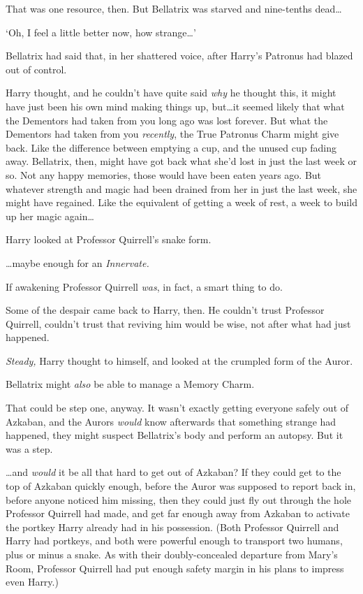 That was one resource, then. But Bellatrix was starved and nine-tenths dead…

‘Oh, I feel a little better now, how strange…’

Bellatrix had said that, in her shattered voice, after Harry’s Patronus had blazed out of control.

Harry thought, and he couldn’t have quite said \emph{why} he thought this, it might have just been his own mind making things up, but…it seemed likely that what the Dementors had taken from you long ago was lost forever. But what the Dementors had taken from you \emph{recently}, the True Patronus Charm might give back. Like the difference between emptying a cup, and the unused cup fading away. Bellatrix, then, might have got back what she’d lost in just the last week or so. Not any happy memories, those would have been eaten years ago. But whatever strength and magic had been drained from her in just the last week, she might have regained. Like the equivalent of getting a week of rest, a week to build up her magic again…

Harry looked at Professor Quirrell’s snake form.

…maybe enough for an \emph{Innervate.}

If awakening Professor Quirrell \emph{was}, in fact, a smart thing to do.

Some of the despair came back to Harry, then. He couldn’t trust Professor Quirrell, couldn’t trust that reviving him would be wise, not after what had just happened.

\emph{Steady,} Harry thought to himself, and looked at the crumpled form of the Auror.

Bellatrix might \emph{also} be able to manage a Memory Charm.

That could be step one, anyway. It wasn’t exactly getting everyone safely out of Azkaban, and the Aurors \emph{would} know afterwards that something strange had happened, they might suspect Bellatrix’s body and perform an autopsy. But it was a step.

…and \emph{would} it be all that hard to get out of Azkaban? If they could get to the top of Azkaban quickly enough, before the Auror was supposed to report back in, before anyone noticed him missing, then they could just fly out through the hole Professor Quirrell had made, and get far enough away from Azkaban to activate the portkey Harry already had in his possession. (Both Professor Quirrell and Harry had portkeys, and both were powerful enough to transport two humans, plus or minus a snake. As with their doubly-concealed departure from Mary’s Room, Professor Quirrell had put enough safety margin in his plans to impress even Harry.)

